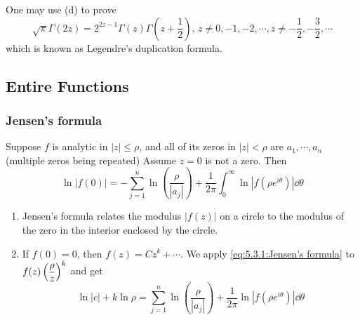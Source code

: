 One may use (d) to prove 
\begin{equation}
    \sqrt{\pi}\Gamma(2z)=2^{2z-1}\Gamma(z)\Gamma(z+\frac{1}{2}),\,z\neq 0,-1,-2,\cdots,z\neq -\frac{1}{2},-\frac{3}{2},\cdots
\end{equation}
which is known as Legendre's duplication formula.

\subsection{Entire Functions}
\subsubsection{Jensen's formula}
\begin{theorem}\label{thm:5.3.1:Jensen's formula}
    Suppose  $ f  $ is analytic in  $ |z| \leq \rho $, and all of its zeros in  $ |z|<\rho $ are  $ a_1,\cdots,a_n $ (multiple zeros being repeated) Assume  $ z=0  $ is not a zero. Then 
    \begin{equation}
        \ln |f(0)|=-\sum_{j=1}^n\ln\left(\frac{\rho}{|a_j|}\right)+\frac{1}{2\pi }\int_0^\infty\ln|f(\rho e^{i\theta})|\dd\theta\label{eq:5.3.1:Jensen's formula}
    \end{equation}  
\end{theorem}
\begin{remark}
    \begin{enumerate}[label=(\arabic*)]
        \item Jensen's formula relates the modulus  $ |f(z)| $ on a circle to the modulus of the zero in the interior enclosed by the circle.
        \item If  $ f(0)=0 $, then  $ f(z)=Cz^k+\cdots $. We apply  \eqref{eq:5.3.1:Jensen's formula} to  $ f(z)\displaystyle\left(\frac{\rho}{z}\right)^k $ and get 
        \begin{equation}
            \ln |c|+k\ln \rho=\sum_{j=1}^n\ln\left(\frac{\rho}{|a_j|}\right)+\frac{1}{2\pi }\ln|f(\rho e^{i\theta})|\dd\theta
        \end{equation}
    \end{enumerate}

\end{remark}
